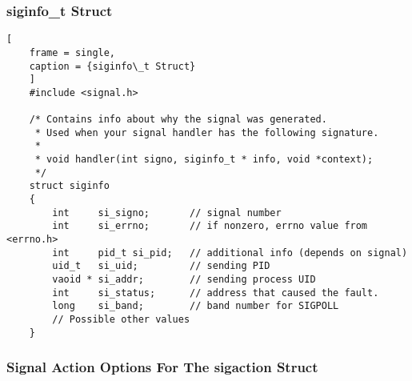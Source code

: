 \documentclass{article}
\begin{document}
\subsubsection{\textbf{siginfo\_t} Struct}
\begin{lstlisting}[
    frame = single,
    caption = {siginfo\_t Struct}
    ]
    #include <signal.h>

    /* Contains info about why the signal was generated.
     * Used when your signal handler has the following signature.
     *
     * void handler(int signo, siginfo_t * info, void *context);
     */
    struct siginfo 
    {
        int     si_signo;       // signal number
        int     si_errno;       // if nonzero, errno value from <errno.h>
        int     pid_t si_pid;   // additional info (depends on signal)
        uid_t   si_uid;         // sending PID
        vaoid * si_addr;        // sending process UID
        int     si_status;      // address that caused the fault.
        long    si_band;        // band number for SIGPOLL
        // Possible other values
    }
\end{lstlisting}
\clearpage
\subsubsection{Signal Action Options For The \textbf{sigaction} Struct}
\end{document}
